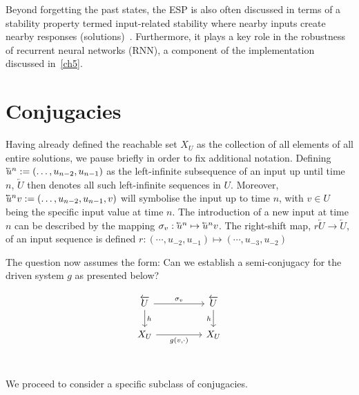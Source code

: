 Beyond forgetting the past states, the ESP is also often discussed in terms of a stability property termed input-related stability where nearby inputs create nearby responses (solutions)~\cite{manjunath2020stability}. Furthermore, it plays a key role in the robustness of recurrent neural networks (RNN), a component of the implementation discussed in~\ref{ch5}.

\section{Conjugacies}

Having already defined the reachable set $X_U$ as the collection of all elements of all entire solutions, we pause briefly in order to fix additional notation.
Defining $\cev{u}^{n}:=(\ldots,u_{n-2} ,u_{n-1})$ as the left-infinite subsequence of an input up until time $n$, $\overleftarrow{U}$ then denotes all such left-infinite sequences in $U$. 
Moreover, $\cev{u}^{n}v:=(\ldots,u_{n-2} ,u_{n-1}, v)$ will symbolise the input up to time $n$, with $v \in U$ being the specific input value at time $n$. 
The introduction of a new input at time $n$ can be described by the mapping $\sigma_v:   \cev{u}^{n} \mapsto \cev{u}^{n}v$. 
The right-shift map, $r\overleftarrow{U}\to\overleftarrow{U}$, of an input sequence is defined $r: (\cdots, u_{-2},u_{-1}) \mapsto(\cdots, u_{-3},u_{-2})$

The question now assumes the form: Can we establish a semi-conjugacy for the driven system $g$ as presented below?

  \begin{equation}\label{Scomm_h}
    \begin{tikzcd}
	{\overleftarrow{U}} && {\overleftarrow{U}} \\
	{X_U} && {X_U} \\
	\arrow["{\sigma_v}", from=1-1, to=1-3]
	\arrow["h"', from=1-3, to=2-3]
	\arrow["h", from=1-1, to=2-1]
	\arrow["{g(v,\cdot)}"', from=2-1, to=2-3]
\end{tikzcd}
\end{equation}

We proceed to consider a specific subclass of conjugacies.

